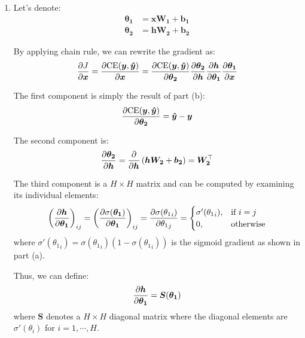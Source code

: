 \documentclass[11pt,reqno]{amsart}
\begin{document}
\begin{enumerate}[topsep=0pt,itemsep=2ex,partopsep=1ex,parsep=1ex]
\begin{enumerate}
  \item
    Let's denote:
    \begin{align*}
      \bm{\theta_1} &= \bm{x W_1} + \bm{b_1} \\
      \bm{\theta_2} &= \bm{h W_2} + \bm{b_2}
    \end{align*}
    
    By applying chain rule, we can rewrite the gradient as:
    \begin{equation*}
      \frac{\partial J}{\partial \bm{x}}
      = \frac{\partial \text{CE}(\bm{y}, \bm{\hat{y}})}{\partial \bm{x}}
      = \frac{\partial \text{CE}(\bm{y}, \bm{\hat{y}})}{\partial \bm{\theta_2}} \frac{\partial \bm{\theta_2}}{\partial \bm{h}} \frac{\partial \bm{h}}{\partial \bm{\theta_1}} \frac{\partial \bm{\theta_1}}{\partial \bm{x}}
    \end{equation*}
    
    The first component is simply the result of part (b):
    \begin{equation*}
      \frac{\partial \text{CE}(\bm{y}, \bm{\hat{y}})}{\partial \bm{\theta_2}} = \bm{\hat{y}} - \bm{y}
    \end{equation*}
    
    The second component is:
    \begin{equation*}
      \frac{\partial \bm{\theta_2}}{\partial \bm{h}} = \frac{\partial}{\partial \bm{h}} \left( \bm{h W_2} + \bm{b_2} \right) = \bm{W_2}^\top
    \end{equation*}

    The third component is a $H \times H$ matrix
    and can be computed by examining its individual elements:
    \begin{equation*}
      \left( \frac{\partial \bm{h}}{\partial \bm{\theta_1}} \right)_{ij}
      = \left( \frac{\partial \sigma(\bm{\theta_1})}{\partial \bm{\theta_1}} \right)_{ij} 
      = \frac{\partial \sigma({\theta_1}_i)}{\partial {\theta_1}_j} = 
      \begin{cases}
        \sigma'({\theta_1}_i), & \text{if}\ i=j \\
        0, & \text{otherwise}
      \end{cases}
    \end{equation*}
    where $\sigma'({\theta_1}_i) = \sigma({\theta_1}_i) \left( 1 - \sigma({\theta_1}_i) \right)$
    is the sigmoid gradient as shown in part (a).

    Thus, we can define: 
    \begin{equation*}
      \frac{\partial \bm{h}}{\partial \bm{\theta_1}} = \bm{S}(\bm{\theta_1})
    \end{equation*}
    where $\bm{S}$ denotes a $H \times H$ diagonal matrix where 
    the diagonal elements are $\sigma'(\theta_i)$ for $i = 1, \cdots, H$.


\end{enumerate}
\end{enumerate}
\end{document}
